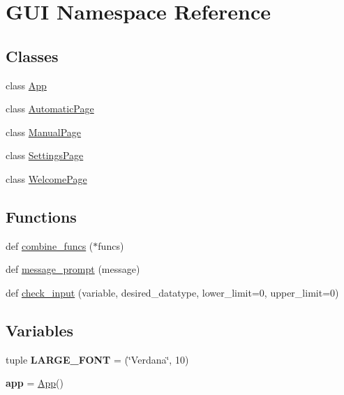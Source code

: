 \hypertarget{namespace_g_u_i}{}\section{G\+UI Namespace Reference}
\label{namespace_g_u_i}
\subsection*{Classes}
\begin{DoxyCompactItemize}
\item 
class \mbox{\hyperlink{class_g_u_i_1_1_app}{App}}
\item 
class \mbox{\hyperlink{class_g_u_i_1_1_automatic_page}{Automatic\+Page}}
\item 
class \mbox{\hyperlink{class_g_u_i_1_1_manual_page}{Manual\+Page}}
\item 
class \mbox{\hyperlink{class_g_u_i_1_1_settings_page}{Settings\+Page}}
\item 
class \mbox{\hyperlink{class_g_u_i_1_1_welcome_page}{Welcome\+Page}}
\end{DoxyCompactItemize}
\subsection*{Functions}
\begin{DoxyCompactItemize}
\item 
def \mbox{\hyperlink{namespace_g_u_i_a4906784b90d5a5544ca9023bee63983e}{combine\+\_\+funcs}} ($\ast$funcs)
\item 
def \mbox{\hyperlink{namespace_g_u_i_aae078fdef2bd79cc7c7c1f2a917c18b1}{message\+\_\+prompt}} (message)
\item 
def \mbox{\hyperlink{namespace_g_u_i_ab5eebe1279ba51c95948fa550f2bc96c}{check\+\_\+input}} (variable, desired\+\_\+datatype, lower\+\_\+limit=0, upper\+\_\+limit=0)
\end{DoxyCompactItemize}
\subsection*{Variables}
\begin{DoxyCompactItemize}
\item 
\mbox{\label{namespace_g_u_i_a0a43ec6a3ff3feb9855ba08afbe1cff4}} 
tuple {\bfseries L\+A\+R\+G\+E\+\_\+\+F\+O\+NT} = (\char`\"{}Verdana\char`\"{}, 10)
\item 
\mbox{\label{namespace_g_u_i_aa8865a45ffd83d7c6062a02c169bc287}} 
{\bfseries app} = \mbox{\hyperlink{class_g_u_i_1_1_app}{App}}()
\end{DoxyCompactItemize}


